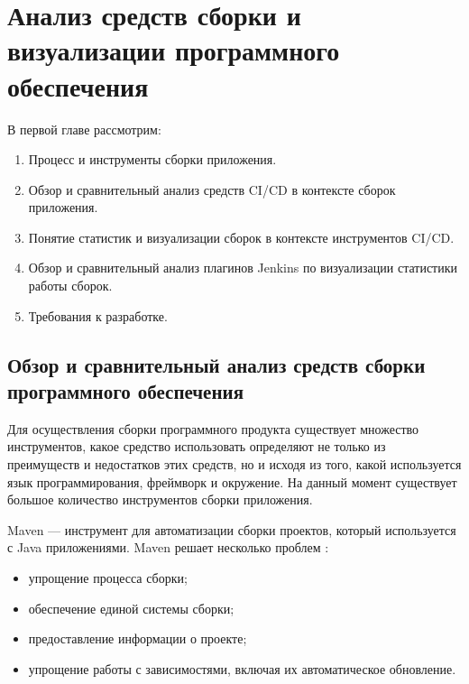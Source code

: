 \chapter{Анализ средств сборки и визуализации программного обеспечения} \label{ch1}


В первой главе рассмотрим:

\begin{enumerate}
	\item Процесс и инструменты сборки приложения.
	
	\item Обзор и сравнительный анализ средств CI/CD в контексте сборок приложения.
	
	\item Понятие статистик и визуализации сборок в контексте инструментов CI/CD.
	
	\item Обзор и сравнительный анализ плагинов Jenkins по визуализации статистики работы сборок.
	
	\item Требования к разработке.
	
	
\end{enumerate}

\section{Обзор и сравнительный анализ средств сборки программного обеспечения} \label{ch1:sec1}

Для осуществления сборки программного продукта существует множество инструментов, какое средство использовать определяют не только из преимуществ и недостатков этих средств, но и исходя из того, какой используется язык программирования, фреймворк и окружение.
На данный момент существует большое количество инструментов сборки приложения. 

Maven — инструмент для автоматизации сборки проектов, который используется с Java приложениями. Maven решает несколько проблем \cite{maven}:

\begin{itemize}
	\item  упрощение процесса сборки;
	\item обеспечение единой системы сборки;
	\item предоставление информации о проекте;
	\item упрощение работы с зависимостями, включая их автоматическое обновление.
\end{itemize}

